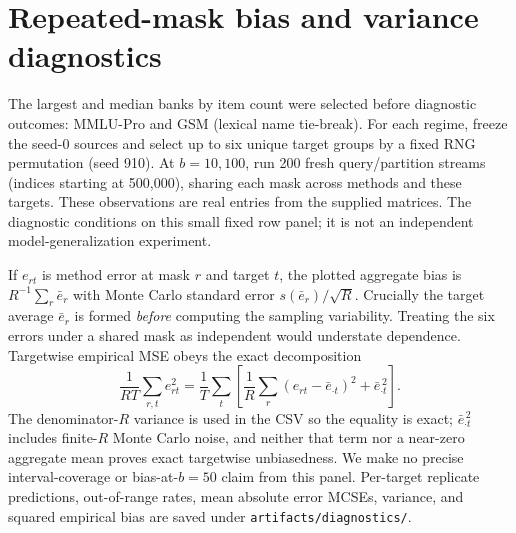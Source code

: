 \section{Repeated-mask bias and variance diagnostics}\label{app:diagnostics}
The largest and median banks by item count were selected before diagnostic outcomes: MMLU-Pro and GSM (lexical name tie-break). For each regime, freeze the seed-0 sources and select up to six unique target groups by a fixed RNG permutation (seed 910). At $b=10,100$, run 200 fresh query/partition streams (indices starting at 500,000), sharing each mask across methods and these targets. These observations are real entries from the supplied matrices. The diagnostic conditions on this small fixed row panel; it is not an independent model-generalization experiment.

If $e_{rt}$ is method error at mask $r$ and target $t$, the plotted aggregate bias is $R^{-1}\sum_r\bar e_r$ with Monte Carlo standard error $s(\bar e_r)/\sqrt R$. Crucially the target average $\bar e_r$ is formed \emph{before} computing the sampling variability. Treating the six errors under a shared mask as independent would understate dependence. Targetwise empirical MSE obeys the exact decomposition
\begin{equation}
\frac1{RT}\sum_{r,t}e_{rt}^2
=\frac1T\sum_t\left[\frac1R\sum_r(e_{rt}-\bar e_{\cdot t})^2+\bar e_{\cdot t}^{\,2}\right].
\end{equation}
The denominator-$R$ variance is used in the CSV so the equality is exact; $\bar e_{\cdot t}^{\,2}$ includes finite-$R$ Monte Carlo noise, and neither that term nor a near-zero aggregate mean proves exact targetwise unbiasedness. We make no precise interval-coverage or bias-at-$b=50$ claim from this panel. Per-target replicate predictions, out-of-range rates, mean absolute error MCSEs, variance, and squared empirical bias are saved under \texttt{artifacts/diagnostics/}.
\begin{table}[h]
\caption{Fixed-source frontier repeated-mask diagnostic, six target groups and 200 masks per condition. Bias is pp $\pm$ one MCSE. Within-target SD is the square root of mean denominator-$R$ targetwise variance, also pp; it is not a per-target confidence interval.}\label{tab:diag}
\centering\scriptsize
\end{table}

